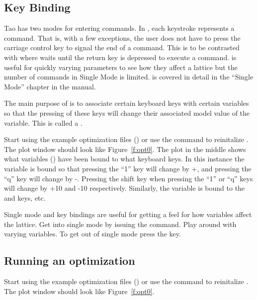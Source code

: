 \documentclass{hitec}
\begin{document}
{\begin{code}
\begin{code}
\subsection{Key Binding}
\label{s:key.bound}

Tao has two modes for entering commands. In , each keystroke represents a
command. That is, with a few exceptions, the user does not have to press the carriage control key to
signal the end of a command. This is to be contrasted with  where \tao waits until
the return key is depressed to execute a command.  is useful for quickly varying
parameters to see how they affect a lattice but the number of commands in Single Mode is limited.
 is covered in detail in the ``Single Mode'' chapter in the \tao manual.

The main purpose of  is to associate certain keyboard keys with certain variables so that
the pressing of these keys will change their associated model value of the variable. This is called
a .

Start \tao using the example optimization files () or use the 
command to reinitalize \tao. The plot window should look like Figure~\ref{f:opt0}. The
 plot in the middle shows what variables () have been bound to what keyboard
keys. In this instance the  variable is bound so that pressing the ``1'' key will change
 by +, and pressing the ``q'' key will change  by -.
Pressing the shift key when pressing the ``1'' or ``q'' keys will change  by
+10 and -10 respectively. Similarly, the  variable is bound
to the  and  keys, etc. 

Single mode and key bindings are useful for getting a feel for how variables affect the lattice. Get
into single mode by issuing the  command. Play around with varying variables. To
get out of single mode press the  key.

\subsection{Running an optimization}
\label{s:opt.run}

Start \tao using the example optimization files () or use the 
command to reinitalize \tao. The plot window should look like Figure~\ref{f:opt0}. 


\end{code}
\end{code}}
\end{document}
